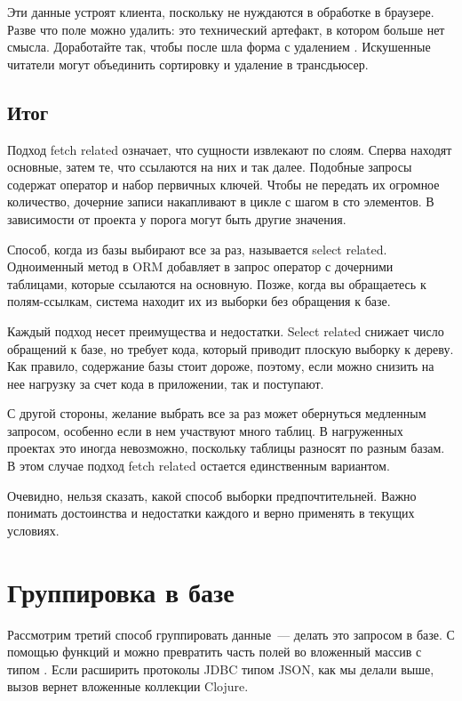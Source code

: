 Эти данные устроят клиента, поскольку не нуждаются в обработке в браузере. Разве что поле  можно удалить: это технический артефакт, в котором больше нет смысла. Доработайте  так, чтобы после  шла форма с удалением . Искушенные читатели могут объединить сортировку и удаление в трансдьюсер.

\subsection{Итог}

Подход fetch related означает, что сущности извлекают по слоям. Сперва находят основные, затем те, что ссылаются на них и так далее. Подобные запросы содержат оператор  и набор первичных ключей. Чтобы не передать их огромное количество, дочерние записи накапливают в цикле с шагом в сто элементов. В зависимости от проекта у порога могут быть другие значения.

Способ, когда из базы выбирают все за раз, называется select related. Одноименный метод в ORM добавляет в запрос оператор  с дочерними таблицами, которые ссылаются на основную. Позже, когда вы обращаетесь к полям-ссылкам, система находит их из выборки без обращения к базе.

Каждый подход несет преимущества и недостатки. Select related снижает число обращений к базе, но требует кода, который приводит плоскую выборку к дереву. Как правило, содержание базы стоит дороже, поэтому, если можно снизить на нее нагрузку за счет кода в приложении, так и поступают.

С другой стороны, желание выбрать все за раз может обернуться медленным запросом, особенно если в нем участвуют много таблиц. В нагруженных проектах это иногда невозможно, поскольку таблицы разносят по разным базам. В этом случае подход fetch related остается единственным вариантом.

Очевидно, нельзя сказать, какой способ выборки предпочтительней. Важно понимать достоинства и недостатки каждого и верно применять в текущих условиях.

\section{Группировка в базе}


Рассмотрим третий способ группировать данные~--- делать это запросом в базе. С помощью функций  и  можно превратить часть полей во вложенный массив с типом . Если расширить протоколы JDBC типом JSON, как мы делали выше, вызов  вернет вложенные коллекции Clojure.

